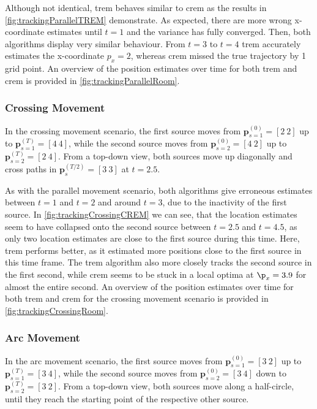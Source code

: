Although not identical, \gls{trem} behaves similar to \gls{crem} as the results in \autoref{fig:trackingParallelTREM} demonstrate. As expected, there are more wrong x-coordinate estimates until $t=1$ and the variance has fully converged. Then, both algorithms display very similar behaviour. From $t=3$ to $t=4$ \gls{trem} accurately estimates the x-coordinate $p_x=2$, whereas \gls{crem} missed the true trajectory by 1 grid point. An overview of the position estimates over time for both \gls{trem} and \gls{crem} is provided in \autoref{fig:trackingParallelRoom}.



\FloatBarrier


\subsubsection*{Crossing Movement}
In the crossing movement scenario, the first source moves from $\bm p^{(0)}_{s=1}=[2~2]$ up to $\bm p^{(T)}_{s=1}=[4~4]$, while the second source moves from $\bm p^{(0)}_{s=2}=[4~2]$ up to $\bm p^{(T)}_{s=2}=[2~4]$. From a top-down view, both sources move up diagonally and cross paths in $\bm p_s^{(T/2)}=[3~3]$ at $t=2.5$.




As with the parallel movement scenario, both algorithms give erroneous estimates between $t=1$ and $t=2$ and around $t=3$, due to the inactivity of the first source. In \autoref{fig:trackingCrossingCREM} we can see, that the location estimates seem to have collapsed onto the second source between $t=2.5$ and $t=4.5$, as only two location estimates are close to the first source during this time. Here, \gls{trem} performs better, as it estimated more positions close to the first source in this time frame. The \gls{trem} algorithm also more closely tracks the second source in the first second, while \gls{crem} seems to be stuck in a local optima at $\p_x=3.9$ for almost the entire second. An overview of the position estimates over time for both \gls{trem} and \gls{crem} for the crossing movement scenario is provided in \autoref{fig:trackingCrossingRoom}.


\FloatBarrier

\subsubsection*{Arc Movement}
In the arc movement scenario, the first source moves from $\bm p^{(0)}_{s=1}=[3~2]$ up to $\bm p^{(T)}_{s=1}=[3~4]$, while the second source moves from $\bm p^{(0)}_{s=2}=[3~4]$ down to $\bm p^{(T)}_{s=2}=[3~2]$. From a top-down view, both sources move along a half-circle, until they reach the starting point of the respective other source.

